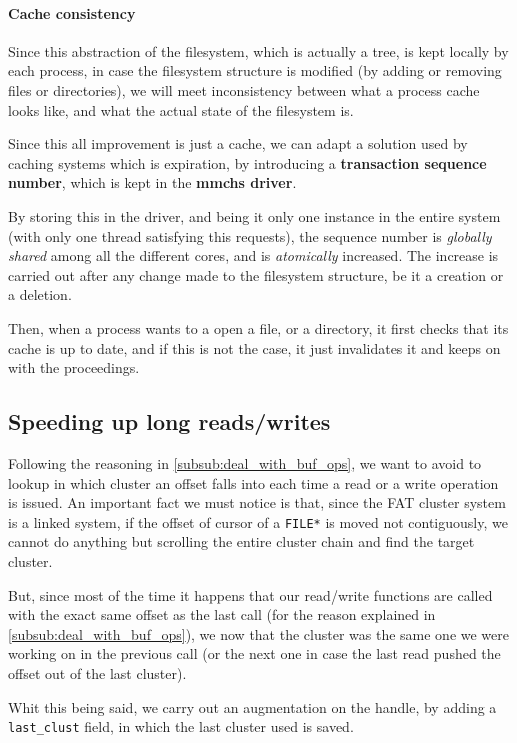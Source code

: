 \documentclass[a4paper,twoside,openright]{report}
\begin{document}
\paragraph{Cache consistency}
Since this abstraction of the filesystem, which is actually a tree, is kept locally by each process, in case the filesystem structure is modified (by adding or removing files or directories), we will meet inconsistency between what a process cache looks like, and what the actual state of the filesystem is.

Since this all improvement is just a cache, we can adapt a solution used by caching systems which is expiration, by introducing a \textbf{transaction sequence number}, which is kept in the \textbf{mmchs driver}.

By storing this in the driver, and being it only one instance in the entire system (with only one thread satisfying this requests), the sequence number is \emph{globally shared} among all the different cores, and is \emph{atomically} increased.
The increase is carried out after any change made to the filesystem structure, be it a creation or a deletion.

Then, when a process wants to a open a file, or a directory, it first checks that its cache is up to date, and if this is not the case, it just invalidates it and keeps on with the proceedings.

\subsection{Speeding up long reads/writes}
\label{sub:last_clust_cache}
Following the reasoning in \ref{subsub:deal_with_buf_ops}, we want to avoid to lookup in which cluster an offset falls into each time a read or a write operation is issued.
An important fact we must notice is that, since the FAT cluster system is a linked system, if the offset of cursor of a \texttt{FILE*} is moved not contiguously, we cannot do anything but scrolling the entire cluster chain and find the target cluster.

But, since most of the time it happens that our read/write functions are called with the exact same offset as the last call (for the reason explained in \ref{subsub:deal_with_buf_ops}), we now that the cluster was the same one we were working on in the previous call (or the next one in case the last read pushed the offset out of the last cluster).

Whit this being said, we carry out an augmentation on the handle, by adding a \texttt{last\_clust} field, in which the last cluster used is saved.
\end{document}
